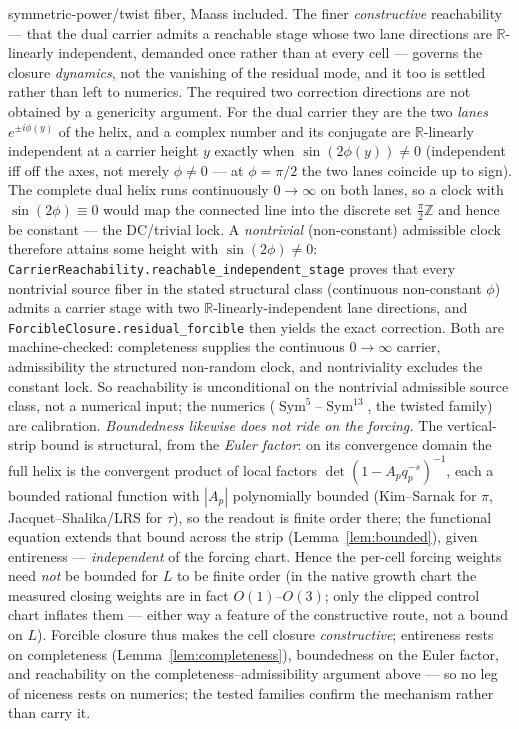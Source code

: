 \documentclass[11pt]{article}
\theoremstyle{definition}
\newcommand{\Sym}{\operatorname{Sym}}
\begin{document}
symmetric-power/twist fiber, Maass included. The finer \emph{constructive} reachability --- that the dual carrier admits a reachable stage whose two lane directions are $\mathbb R$-linearly independent, demanded once rather than at every cell --- governs the closure \emph{dynamics}, not the vanishing of the residual mode, and it too is settled rather than left to numerics. The required two correction directions are not obtained by a genericity argument. For the dual carrier they are the two \emph{lanes} $e^{\pm i\phi(y)}$ of the helix, and a complex number and its conjugate are $\mathbb R$-linearly independent at a carrier height $y$ exactly when $\sin(2\phi(y))\neq0$ (independent iff off the axes, not merely $\phi\neq0$ --- at $\phi=\pi/2$ the two lanes coincide up to sign). The complete dual helix runs continuously $0\to\infty$ on both lanes, so a clock with $\sin(2\phi)\equiv0$ would map the connected line into the discrete set $\tfrac{\pi}{2}\mathbb Z$ and hence be constant --- the DC/trivial lock. A \emph{nontrivial} (non-constant) admissible clock therefore attains some height with $\sin(2\phi)\neq0$: \texttt{CarrierReachability.reachable\_independent\_stage} proves that every nontrivial source fiber in the stated structural class (continuous non-constant $\phi$) admits a carrier stage with two $\mathbb R$-linearly-independent lane directions, and \texttt{ForcibleClosure.residual\_forcible} then yields the exact correction. Both are machine-checked: completeness supplies the continuous $0\to\infty$ carrier, admissibility the structured non-random clock, and nontriviality excludes the constant lock. So reachability is unconditional on the nontrivial admissible source class, not a numerical input; the numerics ($\Sym^5$--$\Sym^{13}$, the twisted family) are calibration. \emph{Boundedness likewise does not ride on the forcing.} The vertical-strip bound is structural,
from the \emph{Euler factor}: on its convergence domain the full helix is the convergent product of local factors
$\det(1-A_{p}q_p^{-s})^{-1}$, each a bounded rational function with $|A_p|$ polynomially bounded (Kim--Sarnak for $\pi$, Jacquet--Shalika/LRS for $\tau$),
so the readout is finite order there; the functional equation extends that bound across the strip
(Lemma~\ref{lem:bounded}), given entireness --- \emph{independent} of the forcing chart. Hence the per-cell
forcing weights need \emph{not} be bounded for $L$ to be finite order (in the native growth chart the measured
closing weights are in fact $O(1)$--$O(3)$; only the clipped control chart inflates them --- either way a
feature of the constructive route, not a bound on $L$). Forcible closure
thus makes the cell closure \emph{constructive}; entireness rests on completeness (Lemma~\ref{lem:completeness}),
boundedness on the Euler factor, and reachability on the completeness--admissibility argument above ---
so no leg of niceness rests on numerics; the tested families confirm the mechanism rather than carry it.
\end{document}
